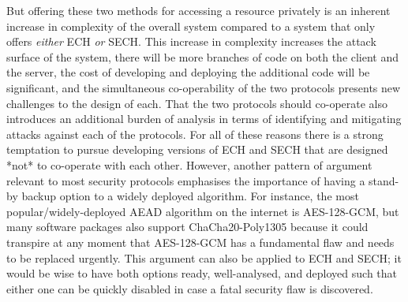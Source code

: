 But offering these two methods for accessing a resource privately
is an inherent increase in complexity of the overall system compared to a system that only offers {\em either}
\ac{ECH} {\em or} \ac{SECH}.
This increase in complexity increases the attack surface of the system,
there will be more branches of code on both the client and the server,
the cost of developing and deploying the additional code will be significant,
and the simultaneous co-operability of the two protocols presents new challenges to the design of each.
That the two protocols should co-operate also introduces an additional burden of analysis in terms of identifying and mitigating attacks against each of the protocols.
For all of these reasons there is a strong temptation to pursue developing versions of \ac{ECH} and \ac{SECH} that are designed *not* to co-operate with each other.
However, another pattern of argument relevant to most security protocols emphasises the importance of having a stand-by backup option to a widely deployed algorithm.
For instance, the most popular/widely-deployed \ac{AEAD} algorithm on the internet is AES-128-GCM,
but many software packages also support ChaCha20-Poly1305 because it could transpire
at any moment that AES-128-GCM has a fundamental flaw and needs to be replaced urgently.
This argument can also be applied to \ac{ECH} and \ac{SECH};
it would be wise to have both options ready, well-analysed, and deployed such that either one can be quickly disabled in case a fatal security flaw is discovered.

